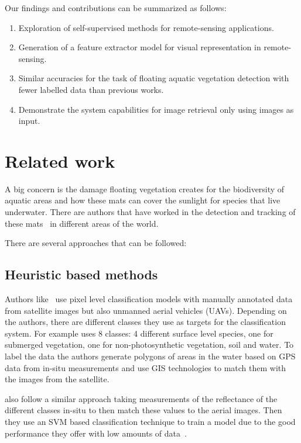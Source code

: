 \documentclass[conference]{IEEEtran}
\begin{document}
    Our findings and contributions can be summarized as follows:
    \begin{enumerate}
            \item Exploration of self-supervised methods for remote-sensing applications.
            \item Generation of a feature extractor model for visual representation in remote-sensing.
            \item Similar accuracies for the task of floating aquatic vegetation detection with fewer labelled data than previous works.
            \item Demonstrate the system capabilities for image retrieval only using images as input.
    \end{enumerate}


    \section{Related work}
    A big concern is the damage floating vegetation creates for the biodiversity of aquatic areas and how these mats can cover the sunlight for species that live underwater.
    There are authors that have worked in the detection and tracking of these mats~\cite{donyana1, donyana2,rs14133013, srilanka_veg, 10.3389/fmars.2022.1004012} in different areas of the world.

    There are several approaches that can be followed:
    \subsection*{Heuristic based methods}

    Authors like~\citet{srilanka_veg, 10.3389/fmars.2022.1004012} use pixel level classification models with manually annotated data from satellite images but also unmanned aerial vehicles (UAVs).
    Depending on the authors, there are different classes they use as targets for the classification system.
    For example \citet{rs14133013} uses 8 classes: 4 different surface level species, one for submerged vegetation, one for non-photosynthetic vegetation, soil and water.
    To label the data the authors generate polygons of areas in the water based on GPS data from in-situ measurements and use GIS technologies to match them with the images from the satellite.

    \citet{10.3389/fmars.2022.1004012} also follow a similar approach taking measurements of the reflectance of the different classes in-situ to then match these values to the aerial images.
    Then they use an SVM based classification technique to train a model due to the good performance they offer with low amounts of data~\cite{Cortes1995}.
\end{document}
